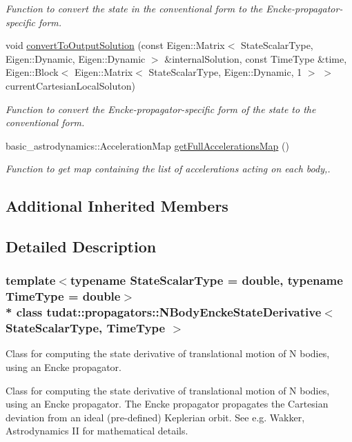 \begin{DoxyCompactItemize}
\begin{DoxyCompactList}\small\item\em Function to convert the state in the conventional form to the Encke-\/propagator-\/specific form. \end{DoxyCompactList}\item 
void \hyperlink{classtudat_1_1propagators_1_1NBodyEnckeStateDerivative_a25e159a87de0078f39a1b15842ac5062}{convert\+To\+Output\+Solution} (const Eigen\+::\+Matrix$<$ State\+Scalar\+Type, Eigen\+::\+Dynamic, Eigen\+::\+Dynamic $>$ \&internal\+Solution, const Time\+Type \&time, Eigen\+::\+Block$<$ Eigen\+::\+Matrix$<$ State\+Scalar\+Type, Eigen\+::\+Dynamic, 1 $>$ $>$ current\+Cartesian\+Local\+Soluton)
\begin{DoxyCompactList}\small\item\em Function to convert the Encke-\/propagator-\/specific form of the state to the conventional form. \end{DoxyCompactList}\item 
basic\+\_\+astrodynamics\+::\+Acceleration\+Map \hyperlink{classtudat_1_1propagators_1_1NBodyEnckeStateDerivative_aa08f372eed53077155c3572d0db36e57}{get\+Full\+Accelerations\+Map} ()
\begin{DoxyCompactList}\small\item\em Function to get map containing the list of accelerations acting on each body,. \end{DoxyCompactList}\end{DoxyCompactItemize}
\subsection*{Additional Inherited Members}


\subsection{Detailed Description}
\subsubsection*{template$<$typename State\+Scalar\+Type = double, typename Time\+Type = double$>$\\*
class tudat\+::propagators\+::\+N\+Body\+Encke\+State\+Derivative$<$ State\+Scalar\+Type, Time\+Type $>$}

Class for computing the state derivative of translational motion of N bodies, using an Encke propagator. 

Class for computing the state derivative of translational motion of N bodies, using an Encke propagator. The Encke propagator propagates the Cartesian deviation from an ideal (pre-\/defined) Keplerian orbit. See e.\+g. Wakker, Astrodynamics II for mathematical details. 


